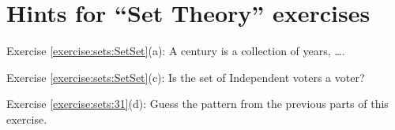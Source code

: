 \section{Hints for ``Set Theory'' exercises}\label{sec:set_chapter:hints}

\noindent Exercise \ref{exercise:sets:SetSet}(a): A century is a collection of years, \ldots.

\noindent Exercise \ref{exercise:sets:SetSet}(c): Is the set of Independent voters a voter?

\noindent Exercise \ref{exercise:sets:31}(d): Guess the pattern from the previous parts of this exercise.
